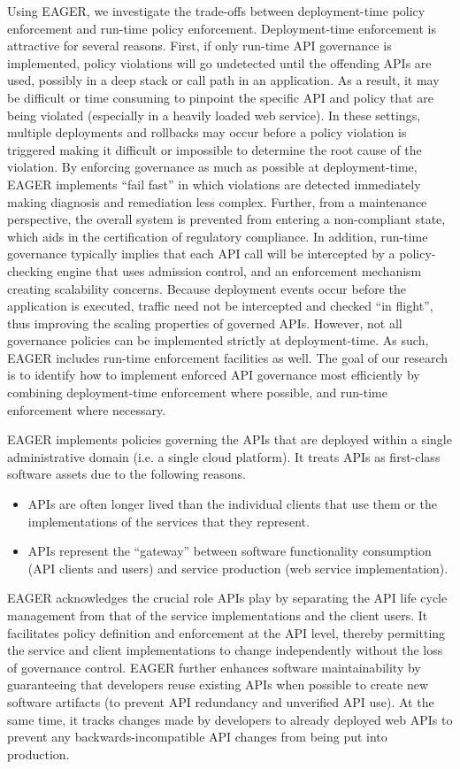 Using EAGER, we investigate the trade-offs between deployment-time policy
enforcement and run-time policy enforcement.
Deployment-time enforcement is attractive for several
reasons.  First, if only run-time API governance is implemented, 
policy violations will go undetected until the offending APIs are used,
possibly in a deep stack or call path in an application.  
As a result, it may be difficult or time consuming to pinpoint the specific
API and policy that are being violated (especially in a heavily loaded web service).
In these settings, multiple deployments and rollbacks may occur before a policy
violation is triggered making it difficult or impossible to determine the root
cause of the violation.  By enforcing governance as much as possible
at deployment-time,
EAGER implements ``fail fast'' in which violations are detected
immediately making diagnosis and remediation less complex.  
Further, from a maintenance perspective,  the overall
system is prevented from entering a non-compliant state, which aids in the
certification of regulatory compliance.  In addition, run-time governance
typically implies that each API call will be intercepted by a policy-checking engine
that uses admission control, and an enforcement mechanism creating scalability
concerns.  Because deployment
events occur before the application is executed,
traffic need not be intercepted and checked ``in flight'', thus improving the
scaling properties of governed APIs.  However, not all governance policies can be
implemented strictly at deployment-time.  As such, EAGER includes run-time
enforcement facilities as well.  The goal of our research is to identify how to
implement enforced API governance most efficiently by combining deployment-time  
enforcement where possible, and run-time enforcement where necessary.

EAGER implements policies governing the APIs that are 
deployed within a single administrative domain (i.e. a single cloud platform). 
It treats APIs as first-class software assets due to the following reasons.
\begin{itemize}
\item APIs are often
longer lived than the individual clients that use them or the implementations
of the services that they represent.
\item APIs represent the
``gateway'' between software functionality consumption 
(API clients and users) and service
production (web service implementation).
\end{itemize}

EAGER acknowledges the crucial role APIs play
 by separating the API life cycle management from that
of the service implementations and the client users.  
It facilitates policy definition and enforcement at
the API level, thereby permitting the service and client implementations to change
independently without the loss of governance control.
EAGER further enhances software maintainability by guaranteeing that 
developers reuse existing APIs when possible to create new software artifacts
(to prevent API redundancy and unverified API use). At the same time, it
tracks changes made by developers to already deployed web APIs to prevent
any backwards-incompatible API changes from being put into production.

